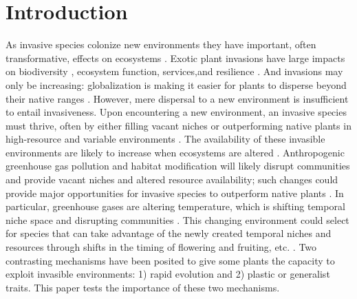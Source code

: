 \documentclass[12pt]{article}\usepackage[]{graphicx}\usepackage[]{color}
\begin{document}
	\section{Introduction}
	As invasive species colonize new environments they have important, often transformative, effects on ecosystems \parencite{Mack2000,Levine2003}.  Exotic plant invasions have large impacts on biodiversity \parencite{Bellard2016,Clavero2005,Walker1997}, ecosystem function, services,and resilience \parencite{Daehler1999,Daehler1994,Ehrenfeld2003,Wilcove1998,Pejchar2009,Pimentel2005,Pysek2010,OTA1993}.  And invasions may only be increasing: globalization is making it easier for plants to disperse beyond their native ranges \parencite{Helmus2014,McKinney1999,Pysek2002,Vitousek1996,Wittenberg2001}. However, mere dispersal to a new environment is insufficient to entail invasiveness. Upon encountering a new environment, an invasive species must thrive, often by either filling vacant niches \parencite{Elton1958} or outperforming native plants in high-resource and variable environments \parencite{Davis2001,Daehler2003}. The availability of these invasible environments are likely to increase when ecosystems are altered \parencite{Tilman2001}. Anthropogenic greenhouse gas pollution and  habitat modification will likely disrupt communities and provide vacant niches and altered resource availability; such changes could provide major opportunities for invasive species to outperform native plants \parencite{Blois2013}. In particular, greenhouse gases are altering temperature, which is shifting temporal niche space and disrupting communities \parencite{Inouye2008,Harte2015}. This changing environment could select for species that can take advantage of the newly created temporal niches and resources through shifts in the timing of flowering and fruiting, etc. \parencite{Franks2007}. Two contrasting mechanisms have been posited to give some plants the capacity to exploit invasible environments: 1) rapid evolution and 2) plastic or generalist traits.  This paper tests the importance of these two mechanisms. 
\end{document}
